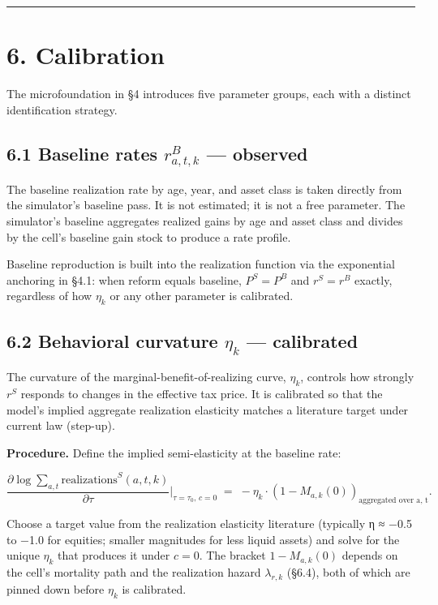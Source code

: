 \documentclass[11pt]{article}
\begin{document}
\par\medskip\hrule\medskip

\section*{6. Calibration}

The microfoundation in §4 introduces five parameter groups, each with a distinct identification strategy.

\subsection*{6.1 Baseline rates $r^B_{a,t,k}$ — observed}

The baseline realization rate by age, year, and asset class is taken directly from the simulator's baseline pass. It is not estimated; it is not a free parameter. The simulator's baseline aggregates realized gains by age and asset class and divides by the cell's baseline gain stock to produce a rate profile.

Baseline reproduction is built into the realization function via the exponential anchoring in §4.1: when reform equals baseline, $P^S = P^B$ and $r^S = r^B$ exactly, regardless of how $\eta_k$ or any other parameter is calibrated.

\subsection*{6.2 Behavioral curvature $\eta_k$ — calibrated}

The curvature of the marginal-benefit-of-realizing curve, $\eta_k$, controls how strongly $r^S$ responds to changes in the effective tax price. It is calibrated so that the model's implied aggregate realization elasticity matches a literature target under current law (step-up).

\textbf{Procedure.} Define the implied semi-elasticity at the baseline rate:

\[
\frac{\partial \log \sum_{a,t} \text{realizations}^S(a,t,k)}{\partial \tau}
\bigg|_{\tau = \tau_0,\, c = 0}
\;=\; -\eta_k \cdot (1 - M_{a,k}(0))_{\text{aggregated over a, t}}.
\]

Choose a target value from the realization elasticity literature (typically η ≈ −0.5 to −1.0 for equities; smaller magnitudes for less liquid assets) and solve for the unique $\eta_k$ that produces it under $c = 0$. The bracket $1 - M_{a,k}(0)$ depends on the cell's mortality path and the realization hazard $\lambda_{r,k}$ (§6.4), both of which are pinned down before $\eta_k$ is calibrated.
\end{document}
